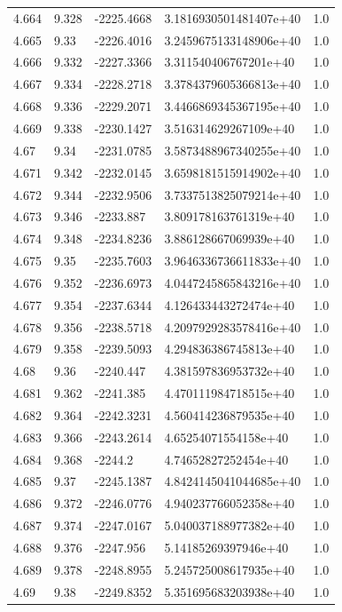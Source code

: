\begin{tabular}{lllll}
4.664 & 9.328 & -2225.4668 & 3.1816930501481407e+40 & 1.0 \\
4.665 & 9.33 & -2226.4016 & 3.2459675133148906e+40 & 1.0 \\
4.666 & 9.332 & -2227.3366 & 3.311540406767201e+40 & 1.0 \\
4.667 & 9.334 & -2228.2718 & 3.3784379605366813e+40 & 1.0 \\
4.668 & 9.336 & -2229.2071 & 3.4466869345367195e+40 & 1.0 \\
4.669 & 9.338 & -2230.1427 & 3.516314629267109e+40 & 1.0 \\
4.67 & 9.34 & -2231.0785 & 3.5873488967340255e+40 & 1.0 \\
4.671 & 9.342 & -2232.0145 & 3.6598181515914902e+40 & 1.0 \\
4.672 & 9.344 & -2232.9506 & 3.7337513825079214e+40 & 1.0 \\
4.673 & 9.346 & -2233.887 & 3.809178163761319e+40 & 1.0 \\
4.674 & 9.348 & -2234.8236 & 3.886128667069939e+40 & 1.0 \\
4.675 & 9.35 & -2235.7603 & 3.9646336736611833e+40 & 1.0 \\
4.676 & 9.352 & -2236.6973 & 4.0447245865843216e+40 & 1.0 \\
4.677 & 9.354 & -2237.6344 & 4.126433443272474e+40 & 1.0 \\
4.678 & 9.356 & -2238.5718 & 4.2097929283578416e+40 & 1.0 \\
4.679 & 9.358 & -2239.5093 & 4.294836386745813e+40 & 1.0 \\
4.68 & 9.36 & -2240.447 & 4.381597836953732e+40 & 1.0 \\
4.681 & 9.362 & -2241.385 & 4.470111984718515e+40 & 1.0 \\
4.682 & 9.364 & -2242.3231 & 4.560414236879535e+40 & 1.0 \\
4.683 & 9.366 & -2243.2614 & 4.65254071554158e+40 & 1.0 \\
4.684 & 9.368 & -2244.2 & 4.74652827252454e+40 & 1.0 \\
4.685 & 9.37 & -2245.1387 & 4.8424145041044685e+40 & 1.0 \\
4.686 & 9.372 & -2246.0776 & 4.940237766052358e+40 & 1.0 \\
4.687 & 9.374 & -2247.0167 & 5.040037188977382e+40 & 1.0 \\
4.688 & 9.376 & -2247.956 & 5.14185269397946e+40 & 1.0 \\
4.689 & 9.378 & -2248.8955 & 5.245725008617935e+40 & 1.0 \\
4.69 & 9.38 & -2249.8352 & 5.351695683203938e+40 & 1.0 \\

\end{tabular}
